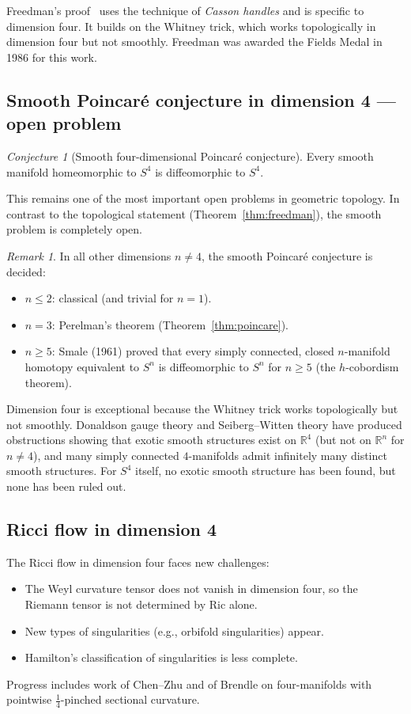 \documentclass[12pt,a4paper]{amsart}
\theoremstyle{definition}
\theoremstyle{remark}
\newtheorem{remark}[theorem]{Remark}
\newtheorem{conjecture}[theorem]{Conjecture}
\newcommand{\R}{\mathbb{R}}
\newcommand{\Ric}{\mathrm{Ric}}
\begin{document}
Freedman's proof~\cite{Freedman1982} uses the technique of
\emph{Casson handles} and is specific to dimension four.  It builds on the
Whitney trick, which works topologically in dimension four but not smoothly.
Freedman was awarded the Fields Medal in 1986 for this work.

\subsection{Smooth Poincar\'{e} conjecture in dimension 4 --- open problem}

\begin{conjecture}[Smooth four-dimensional Poincar\'{e} conjecture]
\label{conj:s4d}
Every smooth manifold homeomorphic to $S^4$ is diffeomorphic to $S^4$.
\end{conjecture}

This remains one of the most important open problems in geometric topology.
In contrast to the topological statement (Theorem~\ref{thm:freedman}), the
smooth problem is completely open.

\begin{remark}
In all other dimensions $n \neq 4$, the smooth Poincar\'{e} conjecture is
decided:
\begin{itemize}
  \item $n \leq 2$: classical (and trivial for $n=1$).
  \item $n = 3$: Perelman's theorem (Theorem~\ref{thm:poincare}).
  \item $n \geq 5$: Smale (1961) proved that every simply connected, closed
    $n$-manifold homotopy equivalent to $S^n$ is diffeomorphic to $S^n$
    for $n \geq 5$ (the $h$-cobordism theorem).
\end{itemize}
Dimension four is exceptional because the Whitney trick works topologically
but not smoothly.  Donaldson gauge theory and Seiberg--Witten theory have
produced obstructions showing that exotic smooth structures exist on $\R^4$
(but not on $\R^n$ for $n \neq 4$), and many simply connected $4$-manifolds
admit infinitely many distinct smooth structures.  For $S^4$ itself, no exotic
smooth structure has been found, but none has been ruled out.
\end{remark}

\subsection{Ricci flow in dimension 4}

The Ricci flow in dimension four faces new challenges:
\begin{itemize}
  \item The Weyl curvature tensor does not vanish in dimension four, so the
    Riemann tensor is not determined by $\Ric$ alone.
  \item New types of singularities (e.g., orbifold singularities) appear.
  \item Hamilton's classification of singularities is less complete.
\end{itemize}
Progress includes work of Chen--Zhu and of Brendle on four-manifolds with
pointwise $\frac{1}{4}$-pinched sectional curvature.
\end{document}
